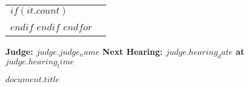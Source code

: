 \documentclass[12pt]{letter}
\begin{document}
\begin{letter}{}
\begin{flushleft}
\begin{tabular}{ p{} | p{} }
          $if(it.count)$ 
            \vspace{.25em} & \\
          $endif$
        $endif$    
      $endfor$

    \end{tabular}
\end{flushleft}
\makebox[0.5\textwidth]{\hrulefill}

  \vspace{2em}
  
  \begin{flushleft}
    \textbf{Judge: $judge.judge_name$} \hfill \textbf{Next Hearing: $judge.hearing_date$ at $judge.hearing_time$}
  \end{flushleft}

  \vspace{2em}
  
  \begin{center}
    \textbf{$document.title$}
  \end{center}

\end{letter}
\end{document}
